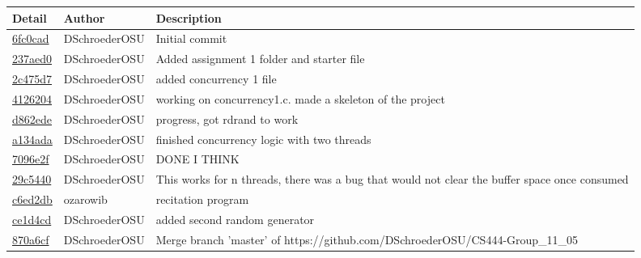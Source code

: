 \documentclass[10pt,letterpaper,draftclsnofoot,onecolumn]{IEEEtran}
\begin{document}
\noindent\begin{tabular}{l l l}\textbf{Detail} & \textbf{Author} & \textbf{Description}\\\hline
\href{https://github.com/DSchroederOSU/CS444-Group\_11\_05/commit/6fc0cad45a2a515f54c120fa6d411cbb62a0eed5}{6fc0cad} & DSchroederOSU & Initial commit\\\hline
\href{https://github.com/DSchroederOSU/CS444-Group\_11\_05/commit/237aed09afe1e61e9421f419164f4d41387adddd}{237aed0} & DSchroederOSU & Added assignment 1 folder and starter file\\\hline
\href{https://github.com/DSchroederOSU/CS444-Group\_11\_05/commit/2c475d7e15d1a54406c275a2a27c5df472c46ded}{2c475d7} & DSchroederOSU & added concurrency 1 file\\\hline
\href{https://github.com/DSchroederOSU/CS444-Group\_11\_05/commit/4126204c49cd2e10090eb4d6bd3183bc23c94648}{4126204} & DSchroederOSU & working on concurrency1.c. made a skeleton of the project\\\hline
\href{https://github.com/DSchroederOSU/CS444-Group\_11\_05/commit/d862edec54dd0eb51bdde6e26337315a2675d434}{d862ede} & DSchroederOSU & progress, got rdrand to work\\\hline
\href{https://github.com/DSchroederOSU/CS444-Group\_11\_05/commit/a134adaeeff0b0ebc7bc662d809edc973ab6f841}{a134ada} & DSchroederOSU & finished concurrency logic with two threads\\\hline
\href{https://github.com/DSchroederOSU/CS444-Group\_11\_05/commit/7096e2f214d8f164dcf02c58d8924f903281e867}{7096e2f} & DSchroederOSU & DONE I THINK\\\hline
\href{https://github.com/DSchroederOSU/CS444-Group\_11\_05/commit/29c5440b4d14c3656d11c907e8794f6f08d98897}{29c5440} & DSchroederOSU & This works for n threads, there was a bug that would not clear the buffer space once consumed\\\hline
\href{https://github.com/DSchroederOSU/CS444-Group\_11\_05/commit/c6ed2db4aab53f542abd8a00c05c9cf7953d9712}{c6ed2db} & ozarowib & recitation program\\\hline
\href{https://github.com/DSchroederOSU/CS444-Group\_11\_05/commit/ce1d4cd2a712b1dfed27d304539fd552d15c4c6c}{ce1d4cd} & DSchroederOSU & added second random generator\\\hline
\href{https://github.com/DSchroederOSU/CS444-Group\_11\_05/commit/870a6cf75e9cf205425b40b0fd90a21bece56299}{870a6cf} & DSchroederOSU & Merge branch 'master' of https://github.com/DSchroederOSU/CS444-Group\_11\_05\\\hline

\end{tabular}
\end{document}
